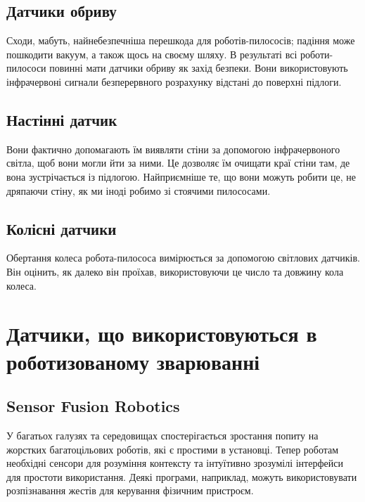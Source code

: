 \documentclass[a4paper,14pt]{extreport}
\begin{document}
 \subsection{Датчики обриву}
Сходи, мабуть, найнебезпечніша перешкода для роботів-пилососів; падіння може пошкодити вакуум, а також щось на своєму шляху. В результаті всі роботи-пилососи повинні мати датчики обриву як захід безпеки. Вони використовують інфрачервоні сигнали безперервного розрахунку відстані до поверхні підлоги.

 \subsection{Настінні датчик}
Вони фактично допомагають їм виявляти стіни за допомогою інфрачервоного світла, щоб вони могли йти за ними. Це дозволяє їм очищати краї стіни там, де вона зустрічається із підлогою. Найприємніше те, що вони можуть робити це, не дряпаючи стіну, як ми іноді робимо зі стоячими пилососами.

 \subsection{Колісні датчики}
Обертання колеса робота-пилососа вимірюється за допомогою світлових датчиків. Він оцінить, як далеко він проїхав, використовуючи це число та довжину кола колеса.


\section{Датчики, що використовуються в роботизованому зварюванні}




\subsection{Sensor Fusion Robotics}
У багатьох галузях та середовищах спостерігається зростання попиту на жорстких багатоцільових роботів, які є простими в установці. Тепер роботам необхідні сенсори для розуміння контексту та інтуїтивно зрозумілі інтерфейси для простоти використання. Деякі програми, наприклад, можуть використовувати розпізнавання жестів для керування фізичним пристроєм.
\end{document}
